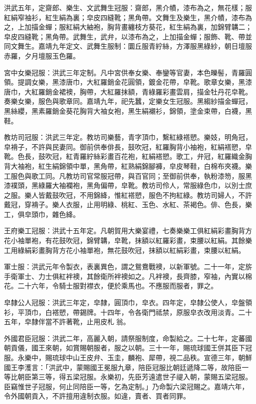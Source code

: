 洪武五年，定齋郎、樂生、文武舞生冠服：齋郎，黑介幘，漆布為之，無花樣；服紅絹窄袖衫，紅生絹為裏；皁皮四縫靴；黑角帶。文舞生及樂生，黑介幘，漆布為之，上加描金蟬；服紅絹大紬袍，胸背畫纏枝方葵花，紅生絹為裏，加錦臂韝二；皁皮四縫靴；黑角帶。武舞生，武弁，以漆布為之，上加描金蟬；服飾、靴、帶並同文舞生。嘉靖九年定文、武舞生服制：圜丘服青紵絲，方澤服黑綠紗，朝日壇服赤羅，夕月壇服玉色羅。

宮中女樂冠服：洪武三年定制。凡中宮供奉女樂、奉鑾等官妻，本色皪髻，青羅圓領。提調女樂，黑漆唐巾，大紅羅銷金花圓領，鍍金花帶，皁靴。歌章女樂，黑漆唐巾，大紅羅銷金裙襖，胸帶，大紅羅抹額，青綠羅彩畫雲肩，描金牡丹花皁靴。奏樂女樂，服色與歌章同。嘉靖九年，祀先蠶，定樂女生冠服。黑縐紗描金蟬冠，黑絲纓，黑素羅銷金葵花胸背大袖女袍，黑生絹襯衫，錦領，塗金束帶，白襪，黑鞋。

教坊司冠服：洪武三年定。教坊司樂藝，青字頂巾，繫紅綠褡愬。樂妓，明角冠，皁褙子，不許與民妻同。御前供奉俳長，鼓吹冠，紅羅胸背小袖袍，紅絹褡愬，皁靴。色長，鼓吹冠，紅青羅紵絲彩畫百花袍，紅絹褡愬。歌工，弁冠，紅羅織金胸背大袖袍，紅生絹錦領中單，黑角帶，紅熟絹錦腳褲，皁皮琴鞋，白棉布夾襪。樂工服色與歌工同。凡教坊司官常服冠帶，與百官同；至御前供奉，執粉漆笏，服黑漆襆頭，黑綠羅大袖襴袍，黑角偏帶，皁靴。教坊司伶人，常服綠色巾，以別士庶之服。樂人皆戴鼓吹冠，不用錦絳，惟紅褡愬，服色不拘紅綠。教坊司婦人，不許戴冠，穿褙子。樂人衣服，止用明綠、桃紅、玉色、水紅、茶褐色。俳、色長，樂工，俱皁頭巾，雜色絳。

王府樂工冠服：洪武十五年定。凡朝賀用大樂宴禮，七奏樂樂工俱紅絹彩畫胸背方花小袖單袍，有花鼓吹冠，錦臂韝，皁靴，抹額以紅羅彩畫，束腰以紅絹。其餘樂工用綠絹彩畫胸背方花小袖單袍，無花鼓吹冠，抹額以紅絹彩畫，束腰以紅絹。

軍士服：洪武元年令製衣，表裏異色，謂之鴛鴦戰襖，以新軍號。二十一年，定旂手衛軍士、力士俱紅袢襖，其餘衛所袢襖如之。凡袢襖，長齊膝，窄袖，內實以棉花。二十六年，令騎士服對襟衣，便於乘馬也。不應服而服者，罪之。

皁隸公人冠服：洪武三年定，皁隸，圓頂巾，皁衣。四年定，皁隸公使人，皁盤領衫，平頂巾，白褡愬，帶錫牌。十四年，令各衛門祗禁，原服皁衣改用淡青。二十五年，皁隸伴當不許著靴，止用皮札翁。

外國君臣冠服：洪武二年，高麗入朝，請祭服制度，命製給之。二十七年，定蕃國朝貢儀，國王來朝，如賞賜朝服者，服之以朝。三十一年，賜琉球國王併其臣下冠服。永樂中，賜琉球中山王皮弁、玉圭，麟袍、犀帶，視二品秩。宣德三年，朝鮮國王李濩言：「洪武中，蒙賜國王冕服九章，陪臣冠服比朝廷遞降二等，故陪臣一等比朝臣第三等，得五梁冠服。永樂初，先臣芳遠遣世子禔入朝，蒙賜五梁冠服。臣竊惟世子冠服，何止同陪臣一等，乞為定制。」乃命製六梁冠賜之。嘉靖六年，令外國朝貢入，不許擅用違制衣服。如違，賣者、買者同罪。

